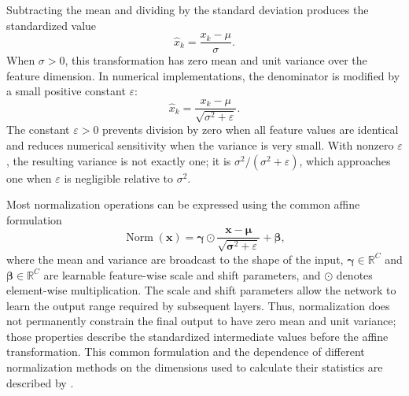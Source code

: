 Subtracting the mean and dividing by the standard deviation produces the
standardized value
\begin{equation}
    \widehat{x}_k
    =
    \frac{x_k-\mu}{\sigma}.
    \label{eq:norm-standardized-value}
\end{equation}
When \(\sigma>0\), this transformation has zero mean and unit variance over
the feature dimension. In numerical implementations, the denominator is
modified by a small positive constant \(\varepsilon\):
\begin{equation}
    \widehat{x}_k
    =
    \frac{x_k-\mu}{\sqrt{\sigma^2+\varepsilon}}.
    \label{eq:norm-epsilon-standardization}
\end{equation}
The constant \(\varepsilon>0\) prevents division by zero when all feature
values are identical and reduces numerical sensitivity when the variance is
very small. With nonzero \(\varepsilon\), the resulting variance is not
exactly one; it is
\(\sigma^2/(\sigma^2+\varepsilon)\), which approaches one when
\(\varepsilon\) is negligible relative to \(\sigma^2\).

Most normalization operations can be expressed using the common affine
formulation
\begin{equation}
    \operatorname{Norm}(\mathbf{x})
    =
    \boldsymbol{\gamma}\odot
    \frac{\mathbf{x}-\boldsymbol{\mu}}
    {\sqrt{\boldsymbol{\sigma}^{2}+\varepsilon}}
    +
    \boldsymbol{\beta},
    \label{eq:norm-general-form}
\end{equation}
where the mean and variance are broadcast to the shape of the input,
\(\boldsymbol{\gamma}\in\mathbb{R}^{C}\) and
\(\boldsymbol{\beta}\in\mathbb{R}^{C}\) are learnable feature-wise scale
and shift parameters, and \(\odot\) denotes element-wise multiplication.
The scale and shift parameters allow the network to learn the output range
required by subsequent layers. Thus, normalization does not permanently
constrain the final output to have zero mean and unit variance; those
properties describe the standardized intermediate values before the affine
transformation. This common formulation and the dependence of different
normalization methods on the dimensions used to calculate their statistics
are described by \textcite{zhu2025dyt}.

